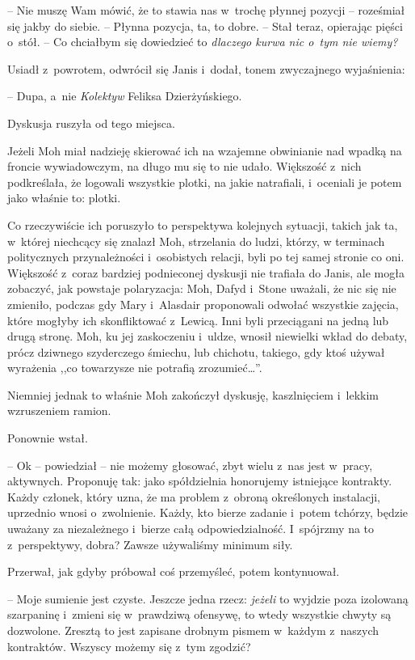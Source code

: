 \documentclass[oneside,polish,11pt,sfheadings]{mwbk}
\begin{document}
-- Nie muszę Wam mówić, że to stawia nas w~trochę płynnej pozycji -- roześmiał się jakby do siebie. -- Płynna pozycja, ta, to dobre. -- Stał
teraz, opierając pięści o~stół. -- Co chciałbym się dowiedzieć to
\emph{dlaczego kurwa nic o~tym nie wiemy?}

Usiadł z~powrotem, odwrócił się Janis i~dodał, tonem zwyczajnego
wyjaśnienia: 

-- Dupa, a~nie \emph{Kolektyw} Feliksa Dzierżyńskiego.

Dyskusja ruszyła od tego miejsca.

Jeżeli Moh miał nadzieję skierować ich na wzajemne obwinianie nad wpadką
na froncie wywiadowczym, na długo mu się to nie udało. Większość z~nich
podkreślała, że logowali wszystkie plotki, na jakie natrafiali, i~oceniali je potem jako właśnie to: plotki.

Co rzeczywiście ich poruszyło to perspektywa kolejnych sytuacji, takich
jak ta, w~której niechcący się znalazł Moh, strzelania do ludzi, którzy,
w terminach politycznych przynależności i~osobistych relacji, byli po
tej samej stronie co oni. Większość z~coraz bardziej podnieconej
dyskusji nie trafiała do Janis, ale mogła zobaczyć, jak powstaje
polaryzacja: Moh, Dafyd i~Stone uważali, że nic się nie zmieniło,
podczas gdy Mary i~Alasdair proponowali odwołać wszystkie zajęcia, które
mogłyby ich skonfliktować z~Lewicą. Inni byli przeciągani na jedną lub
drugą stronę. Moh, ku jej zaskoczeniu i~uldze, wnosił niewielki wkład do
debaty, prócz dziwnego szyderczego śmiechu, lub chichotu, takiego, gdy
ktoś używał wyrażenia ,,co towarzysze nie potrafią zrozumieć\ldots''.

Niemniej jednak to właśnie Moh zakończył dyskusję, kaszlnięciem i~lekkim
wzruszeniem ramion.

Ponownie wstał. 

-- Ok -- powiedział -- nie możemy głosować, zbyt wielu z~nas jest w~pracy, aktywnych. Proponuję tak: jako spółdzielnia honorujemy
istniejące kontrakty. Każdy członek, który uzna, że ma problem z~obroną
określonych instalacji, uprzednio wnosi o~zwolnienie. Każdy, kto bierze
zadanie i~potem tchórzy, będzie uważany za niezależnego i~bierze całą
odpowiedzialność. I~spójrzmy na to z~perspektywy, dobra? Zawsze
używaliśmy minimum siły.

Przerwał, jak gdyby próbował coś przemyśleć, potem kontynuował. 

-- Moje
sumienie jest czyste. Jeszcze jedna rzecz: \emph{jeżeli} to wyjdzie poza
izolowaną szarpaninę i~zmieni się w~prawdziwą ofensywę, to wtedy
wszystkie chwyty są dozwolone. Zresztą to jest zapisane drobnym pismem w~każdym z~naszych kontraktów. Wszyscy możemy się z~tym zgodzić?
\end{document}

